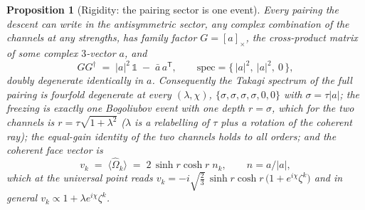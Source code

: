 \documentclass[11pt]{article}
\newtheorem{proposition}[theorem]{Proposition}
\theoremstyle{definition}
\theoremstyle{plain}
\begin{document}
\begin{proposition}[Rigidity: the pairing sector is one event]\label{c:families.rigidity-pairing-sector-one-event}
Every pairing the descent can write in the antisymmetric sector, any complex combination of the channels at any strengths, has family factor $G = [a]_{\times}$, the cross-product matrix of some complex $3$-vector $a$, and
\begin{equation}
G G^{\dagger} \;=\; |a|^{2}\,\mathbb{1} \;-\; \bar{a}\,a^{\mathsf{T}}, \qquad \mathrm{spec} = \{\,|a|^{2},\ |a|^{2},\ 0\,\},
\end{equation}
doubly degenerate identically in $a$. Consequently the Takagi spectrum of the full pairing is fourfold degenerate at every $(\lambda, \chi)$, $\{\sigma, \sigma, \sigma, \sigma, 0, 0\}$ with $\sigma = \tau|a|$; the freezing is exactly one Bogoliubov event with one depth $r = \sigma$, which for the two channels is $r = \tau\sqrt{1 + \lambda^{2}}$ ($\lambda$ is a relabelling of $\tau$ plus a rotation of the coherent ray); the equal-gain identity of the two channels holds to all orders; and the coherent face vector is
\[
v_{k} \;=\; \langle \hat\Omega_{k}\rangle \;=\; 2\,\sinh r\cosh r\;n_{k}, \qquad n = a/|a|,
\]
which at the universal point reads $v_{k} = -i\sqrt{\tfrac{2}{3}}\,\sinh r\cosh r\,\bigl(1 + e^{i\chi}\zeta^{k}\bigr)$ and in general $v_{k} \propto 1 + \lambda e^{i\chi}\zeta^{k}$.
\end{proposition}
\end{document}
